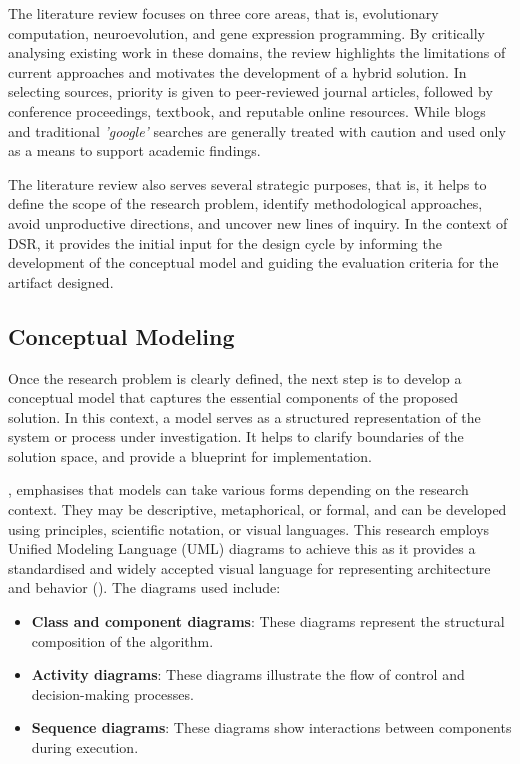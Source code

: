 \noindent The literature review focuses on three core areas, that is, evolutionary computation, neuroevolution, and gene expression programming. By critically analysing existing work in these domains, the review highlights the limitations of current approaches and motivates the development of a hybrid solution. In selecting sources, priority is given to peer-reviewed journal articles, followed by conference proceedings, textbook, and reputable online resources. While blogs and traditional \textit{'google'} searches are generally treated with caution and used only as a means to support academic findings. \bigskip

\noindent The literature review also serves several strategic purposes, that is, it helps to define the scope of the research problem, identify methodological approaches, avoid unproductive directions, and uncover new lines of inquiry. In the context of DSR, it provides the initial input for the design cycle by informing the development of the conceptual model and guiding the evaluation criteria for the artifact designed.

\subsection{Conceptual Modeling}
Once the research problem is clearly defined, the next step is to develop a conceptual model that captures the essential components of the proposed solution. In this context, a model serves as a structured representation of the system or process under investigation. It helps to clarify boundaries of the solution space, and provide a blueprint for implementation. \bigskip

\noindent \cite{olivier2009information}, emphasises that models can take various forms depending on the research context. They may be descriptive, metaphorical, or formal, and can be developed using principles, scientific notation, or visual languages. This research employs Unified Modeling Language (UML) diagrams to achieve this as it provides a standardised and widely accepted visual language for representing architecture and behavior (\cite{koc2021uml}). The diagrams used include:
\begin{itemize}
    \item \textbf{Class and component diagrams}: These diagrams represent the structural composition of the algorithm.
    \item \textbf{Activity diagrams}: These diagrams illustrate the flow of control and decision-making processes.
    \item \textbf{Sequence diagrams}: These diagrams show interactions between components during execution.
\end{itemize}

